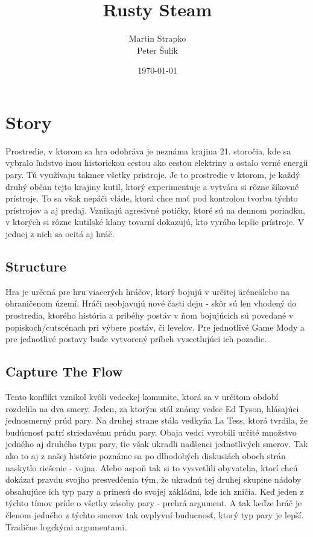 \documentclass[a4paper]{report}
\title{Rusty Steam}
\author{Martin Strapko \\ Peter Šulík}
\date{\today}
\begin{document}
\maketitle

\tableofcontents
 
\chapter{Story}
Prostredie, v ktorom sa hra odohráva je neznáma krajina 21. storočia, kde sa vybralo ľudstvo inou historickou cestou ako cestou elektriny a ostalo verné energii pary. Tú využívaju takmer všetky pristroje. Je to  prostredie v ktorom, je každý druhý občan tejto krajiny kutil, ktorý experimentuje a vytvára si rôzne šikovné prístroje. To sa však nepáči vláde, ktorá chce mať pod kontrolou tvorbu týchto prístrojov a aj predaj. Vznikajú agresivné potičky, ktoré sú na dennom poriadku, v ktorých si rôzne kutilské klany tovarní dokazujú, kto vyrába lepšie prístroje. V jednej z nich sa ocitá aj hráč. 

\section{Structure}
Hra je určená pre hru viacerých hráčov, ktorý bojujú v určitej \"aréne\" alebo na ohraničenom území. Hráči neobjavujú nové časti deju - skôr sú len vhodený do prostredia, ktorého história a pribéhy postáv v ňom bojujúcich sú povedané v popiskoch/cutscénach pri výbere postáv, či levelov. Pre jednotlivé Game Mody a pre jednotlivé postavy bude vytvorený príbeh vyscetlujúci ich pozadie.

\section{Capture The Flow}
Tento konflikt vznikol kvôli vedeckej komunite, ktorá sa v určitom období rozdelila na dva smery. Jeden, za ktorým stál známy vedec Ed Tyson, hlásajúci jednosmerný prúd pary. Na druhej strane stála vedkyňa La Tess, ktorá tvrdila, že budúcnosť patrí striedavému prúdu pary. Obaja vedci vyrobili určité množstvo jedného aj druhého typu pary, tie však ukradli nadšenci jednotlivých smerov. Tak ako to aj z našej histórie poznáme sa po dlhodobých diskusiách oboch strán naskytlo riešenie - vojna. Alebo aspoň tak si to vysvetlili obyvatelia, ktorí chcú dokázať pravdu svojho presvedčenia tým, že ukradnú tej druhej skupine nádoby obsahujúce ich typ pary a prinesú do svojej zákládni, kde ich zničia. Keď jeden z týchto tímov príde o všetky zásoby pary - prehrá argument. A tak keďze hráč je členom jedného z týchto smerov tak ovplyvní buducnosť, ktorý typ pary je lepší. Tradične logckými argumentami.
\end{document}
